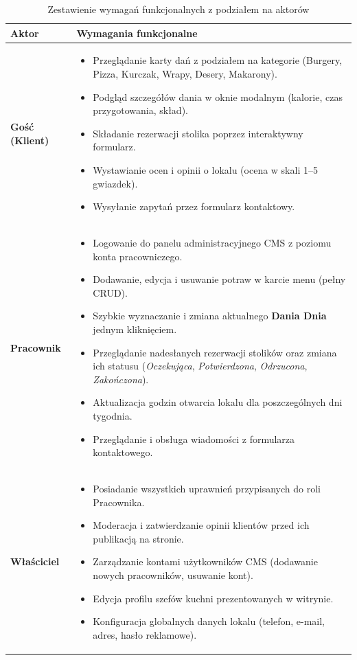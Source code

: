 \documentclass[12pt,a4paper]{article}
\begin{document}
\begin{table}[H]
\centering
\small
\begin{tabularx}{\textwidth}{lX}
\toprule
\textbf{Aktor} & \textbf{Wymagania funkcjonalne} \\
\midrule
\textbf{Gość (Klient)} & 
\begin{itemize}
    \item Przeglądanie karty dań z podziałem na kategorie (Burgery, Pizza, Kurczak, Wrapy, Desery, Makarony).
    \item Podgląd szczegółów dania w oknie modalnym (kalorie, czas przygotowania, skład).
    \item Składanie rezerwacji stolika poprzez interaktywny formularz.
    \item Wystawianie ocen i opinii o lokalu (ocena w skali 1--5 gwiazdek).
    \item Wysyłanie zapytań przez formularz kontaktowy.
\end{itemize} \\
\midrule
\textbf{Pracownik} & 
\begin{itemize}
    \item Logowanie do panelu administracyjnego CMS z poziomu konta pracowniczego.
    \item Dodawanie, edycja i usuwanie potraw w karcie menu (pełny CRUD).
    \item Szybkie wyznaczanie i zmiana aktualnego \textbf{Dania Dnia} jednym kliknięciem.
    \item Przeglądanie nadesłanych rezerwacji stolików oraz zmiana ich statusu (\textit{Oczekująca}, \textit{Potwierdzona}, \textit{Odrzucona}, \textit{Zakończona}).
    \item Aktualizacja godzin otwarcia lokalu dla poszczególnych dni tygodnia.
    \item Przeglądanie i obsługa wiadomości z formularza kontaktowego.
\end{itemize} \\
\midrule
\textbf{Właściciel} & 
\begin{itemize}
    \item Posiadanie wszystkich uprawnień przypisanych do roli Pracownika.
    \item Moderacja i zatwierdzanie opinii klientów przed ich publikacją na stronie.
    \item Zarządzanie kontami użytkowników CMS (dodawanie nowych pracowników, usuwanie kont).
    \item Edycja profilu szefów kuchni prezentowanych w witrynie.
    \item Konfiguracja globalnych danych lokalu (telefon, e-mail, adres, hasło reklamowe).
\end{itemize} \\
\bottomrule
\end{tabularx}
\caption{Zestawienie wymagań funkcjonalnych z podziałem na aktorów}
\end{table}
\end{document}
